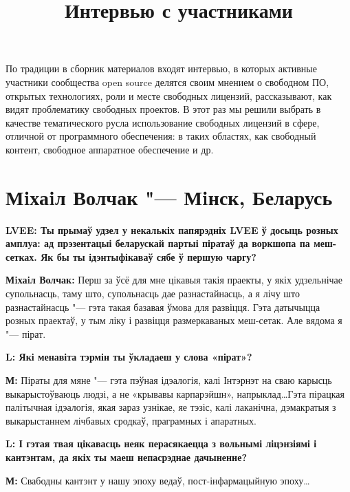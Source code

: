 \documentclass[10pt, a5paper]{article}
\begin{document}
\title{Интервью с участниками}
\date{}
\maketitle

По традиции в сборник материалов входят интервью, в которых активные участники
сообщества open source делятся своим мнением о свободном ПО, открытых
технологиях, роли и месте свободных лицензий, рассказывают, как видят проблематику
свободных проектов. В этот раз мы решили выбрать в качестве тематического русла
использование свободных лицензий в сфере, отличной от программного обеспечения:
в таких областях, как свободный контент, свободное аппаратное обеспечение и др.

\section{Мiхаiл Волчак "--- Мiнск, Беларусь}

{\noindent \bf LVEE: Ты прымаў удзел у некалькіх папярэдніх LVEE ў досыць розных амплуа: ад прэзентацыі беларускай партыі піратаў да воркшопа па меш-сетках. Як бы ты ідэнтыфікаваў сябе ў першую чаргу?
}

{\noindent \bf Мiхаiл Волчак:} Перш за ўсё для мне цікавыя такія праекты, у якіх удзельнічае супольнасць, таму што, супольнасць дае разнастайнасць, а я лічу што разнастайнасць "--- гэта такая базавая ўмова для развіцця. Гэта датычыцца розных праектаў, у тым ліку і развіцця размеркаваных меш-сетак. Але вядома я "--- пірат.

{\noindent \bf L: Які менавіта тэрмін ты ўкладаеш у слова «пірат»?}

{\noindent \bf М:} Піраты для мяне "--- гэта пэўная ідэалогія, калі Інтэрнэт на сваю карысць выкарыстоўваюць людзі, а не «крывавы карпарэйшн», напрыклад\ldots Гэта пірацкая палітычная ідэалогія, якая зараз узнікае, яе тэзіс, калі лаканічна, дэмакратыя з выкарыстаннем лічбавых сродкаў, праграмных і апаратных.




{\noindent \bf L: І гэтая твая цікавасць неяк перасякаецца з вольнымі ліцэнзіямі і кантэнтам, да якіх ты маеш непасрэднае дачыненне?} 

{\noindent \bf М:}  Свабодны кантэнт у нашу эпоху ведаў, пост-інфармацыйную эпоху\ldots
\end{document}
